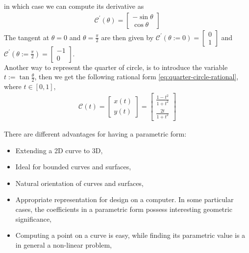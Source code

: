 in which case we can compute its derivative as 
\begin{align}
  \mathcal{C}^\prime(\theta) = 
  \begin{bmatrix}
    -\sin \theta \\ \cos \theta
  \end{bmatrix}
  \label{eq:quarter-circle-polair-derivative}
\end{align}
The tangent at $\theta = 0$ and $\theta = \frac{\pi}{2}$ are then given by 
$\mathcal{C}^\prime(\theta := 0) = 
  \begin{bmatrix}
    0 \\ 1 
  \end{bmatrix}
$ 
and 
$\mathcal{C}^\prime(\theta := \frac{\pi}{2}) = 
  \begin{bmatrix}
    -1 \\ 0 
  \end{bmatrix}
$.
\\
\noindent
Another way to represent the quarter of circle, is to introduce the variable $t := \tan \frac{\theta}{2}$, then we get the following rational form \ref{eq:quarter-circle-rational}, where $t \in \left[ 0, 1 \right]$,
\begin{align}
  \mathcal{C}(t) = 
  \begin{bmatrix}
    x(t) \\ y(t)
  \end{bmatrix} =
  \begin{bmatrix}
    \frac{1-t^2}{1+t^2} \\ \frac{2t}{1+t^2}
  \end{bmatrix}
  \label{eq:quarter-circle-rational}
\end{align}

\noindent
There are different advantages for having a parametric form:
\begin{itemize}
  \item Extending a 2D curve to 3D,
  \item Ideal for bounded curves and surfaces,   
  \item Natural orientation of curves and surfaces,
  \item Appropriate representation for design on a computer. In some particular cases, the coefficients in a parametric form possess interesting geometric significance, 
  \item Computing a point on a curve is easy, while finding its parametric value is a in general a non-linear problem, 
\end{itemize}

